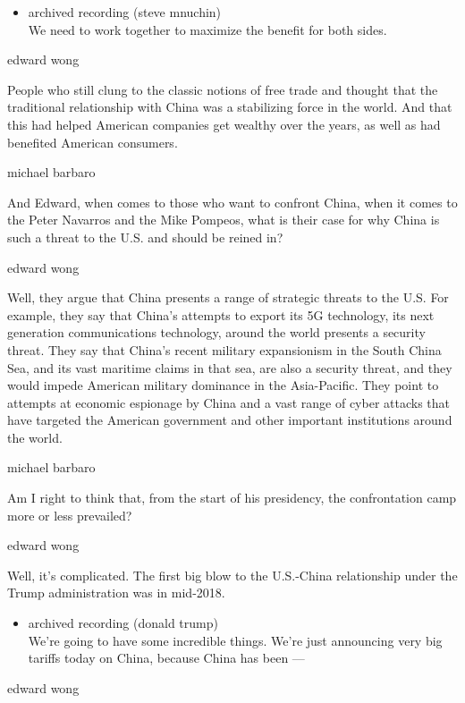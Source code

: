 \begin{itemize}
\tightlist
\item
  archived recording (steve mnuchin)\\
  We need to work together to maximize the benefit for both sides.
\end{itemize}

edward wong

People who still clung to the classic notions of free trade and thought
that the traditional relationship with China was a stabilizing force in
the world. And that this had helped American companies get wealthy over
the years, as well as had benefited American consumers.

michael barbaro

And Edward, when comes to those who want to confront China, when it
comes to the Peter Navarros and the Mike Pompeos, what is their case for
why China is such a threat to the U.S. and should be reined in?

edward wong

Well, they argue that China presents a range of strategic threats to the
U.S. For example, they say that China's attempts to export its 5G
technology, its next generation communications technology, around the
world presents a security threat. They say that China's recent military
expansionism in the South China Sea, and its vast maritime claims in
that sea, are also a security threat, and they would impede American
military dominance in the Asia-Pacific. They point to attempts at
economic espionage by China and a vast range of cyber attacks that have
targeted the American government and other important institutions around
the world.

michael barbaro

Am I right to think that, from the start of his presidency, the
confrontation camp more or less prevailed?

edward wong

Well, it's complicated. The first big blow to the U.S.-China
relationship under the Trump administration was in mid-2018.

\begin{itemize}
\tightlist
\item
  archived recording (donald trump)\\
  We're going to have some incredible things. We're just announcing very
  big tariffs today on China, because China has been ---
\end{itemize}

edward wong

